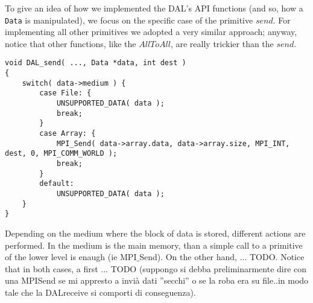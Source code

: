 To give an idea of how we implemented the DAL's API functions (and so, how a \texttt{Data} is manipulated), we focus on the specific case of the primitive $send$. For implementing all other primitives we adopted a very similar approach; anyway, notice that other functions, like the $AllToAll$, are really trickier than the $send$. 
\begin{lstlisting}
void DAL_send( ..., Data *data, int dest )
{
	switch( data->medium ) {
		case File: {
			UNSUPPORTED_DATA( data );
			break;
		}
		case Array: {
			MPI_Send( data->array.data, data->array.size, MPI_INT, dest, 0, MPI_COMM_WORLD );
			break;
		}
		default:
			UNSUPPORTED_DATA( data );
	}
}
\end{lstlisting}
Depending on the medium where the block of data is stored, different actions are performed. In the medium is the main memory, than a simple call to a primitive of the lower level is enaugh (ie MPI$\_$Send). On the other hand, ... TODO. Notice that in both cases, a first ... TODO (suppongo si debba preliminarmente dire con una MPISend se mi appresto a invià dati ''secchi'' o se la roba era su file..in modo tale che la DALreceive si comporti di conseguenza).


